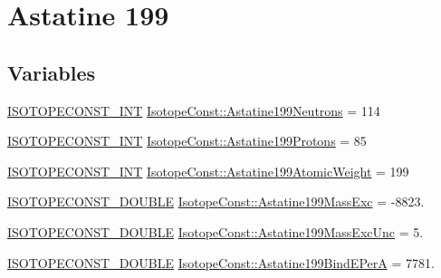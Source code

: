 \hypertarget{group___isotope_const-_astatine-_at199}{}\section{Astatine 199}
\label{group___isotope_const-_astatine-_at199}
\subsection*{Variables}
\begin{DoxyCompactItemize}
\item 
\mbox{\hyperlink{group___isotope_const-_macros_ga5f18360b3e99483a35c32d789e62621c}{I\+S\+O\+T\+O\+P\+E\+C\+O\+N\+S\+T\+\_\+\+I\+NT}} \mbox{\hyperlink{group___isotope_const-_astatine-_at199_gaca10f00d3fe7acd7c3adc2a3fc286d55}{Isotope\+Const\+::\+Astatine199\+Neutrons}} = 114
\item 
\mbox{\hyperlink{group___isotope_const-_macros_ga5f18360b3e99483a35c32d789e62621c}{I\+S\+O\+T\+O\+P\+E\+C\+O\+N\+S\+T\+\_\+\+I\+NT}} \mbox{\hyperlink{group___isotope_const-_astatine-_at199_ga9fa6409458dc25edf609312a45bfb009}{Isotope\+Const\+::\+Astatine199\+Protons}} = 85
\item 
\mbox{\hyperlink{group___isotope_const-_macros_ga5f18360b3e99483a35c32d789e62621c}{I\+S\+O\+T\+O\+P\+E\+C\+O\+N\+S\+T\+\_\+\+I\+NT}} \mbox{\hyperlink{group___isotope_const-_astatine-_at199_ga3ac86893a672118309be55cc4cb342d4}{Isotope\+Const\+::\+Astatine199\+Atomic\+Weight}} = 199
\item 
\mbox{\hyperlink{group___isotope_const-_macros_ga8f45a7272ce02c0b4c65c44636ed719a}{I\+S\+O\+T\+O\+P\+E\+C\+O\+N\+S\+T\+\_\+\+D\+O\+U\+B\+LE}} \mbox{\hyperlink{group___isotope_const-_astatine-_at199_ga3f4f0d72072ae72f6da266e44a513560}{Isotope\+Const\+::\+Astatine199\+Mass\+Exc}} = -\/8823.
\item 
\mbox{\hyperlink{group___isotope_const-_macros_ga8f45a7272ce02c0b4c65c44636ed719a}{I\+S\+O\+T\+O\+P\+E\+C\+O\+N\+S\+T\+\_\+\+D\+O\+U\+B\+LE}} \mbox{\hyperlink{group___isotope_const-_astatine-_at199_ga4ffb4aac85ef748476fb3552924dc3b4}{Isotope\+Const\+::\+Astatine199\+Mass\+Exc\+Unc}} = 5.
\item 
\mbox{\hyperlink{group___isotope_const-_macros_ga8f45a7272ce02c0b4c65c44636ed719a}{I\+S\+O\+T\+O\+P\+E\+C\+O\+N\+S\+T\+\_\+\+D\+O\+U\+B\+LE}} \mbox{\hyperlink{group___isotope_const-_astatine-_at199_gaa0da8813ae6f138f6da660a457fbf6ee}{Isotope\+Const\+::\+Astatine199\+Bind\+E\+PerA}} = 7781.
\item 

\end{DoxyCompactItemize}

